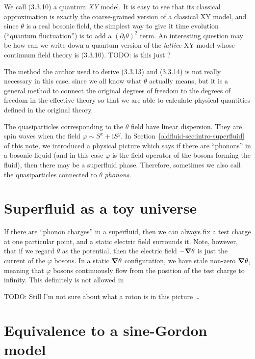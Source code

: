 \documentclass[hyperref, a4paper]{article}
\newcommand*{\ii}{\mathrm{i}}
\newcommand{\oldfluid}{\href{fluid.pdf}{this note}}
\begin{document}
We call (3.3.10) a quantum \emph{XY} model. It is easy to see that its classical approximation is 
exactly the coarse-grained version of a classical XY model, and since $\theta$ is a real bosonic field,
the simplest way to give it time evolution (``quantum fluctuation'') is to add a $(\partial_t \theta)^2$
term. An interesting question may be how can we write down a quantum version of the \emph{lattice} XY 
model whose continuum field theory is (3.3.10). TODO: is this just \cite{latticemodel,Z_iga_2014}?

The method the author used to derive (3.3.13) and (3.3.14) is not really necessary in this case, 
since we all know what $\theta$ actually means, but it is a general method to connect the original 
degrees of freedom to the degrees of freedom in the effective theory so that we are able to calculate 
physical quantities defined in the original theory.

The quasiparticles corresponding to the $\theta$ field have linear dispersion. They are spin waves when 
the field $\varphi \sim S^x + \ii S^y$. In Section~\ref{oldfluid-sec:intro-superfluid} of \oldfluid,
we introduced a physical picture which says if there are ``phonons'' in a bosonic liquid (and in this case 
$\varphi$ is the field operator of the bosons forming the fluid), then there may be a superfluid phase.
Therefore, sometimes we also call the quasiparticles connected to $\theta$ \emph{phonons}.

\section{Superfluid as a toy universe}

If there are ``phonon charges'' in a superfluid, then we can always fix a test charge at one particular 
point, and a static electric field surrounds it. Note, however, that if we regard $\theta$ as the potential,
then the electric field $- \grad \theta$ is just the current of the $\varphi$ bosons. In a static $\grad{\theta}$
configuration, we have stale non-zero $\grad{\theta}$, meaning that $\varphi$ bosons continuously flow from 
the position of the test charge to infinity. This definitely is not allowed in 

TODO: Still I'm not sure about what a roton is in this picture \ldots

\section{Equivalence to a sine-Gordon model}
\end{document}
